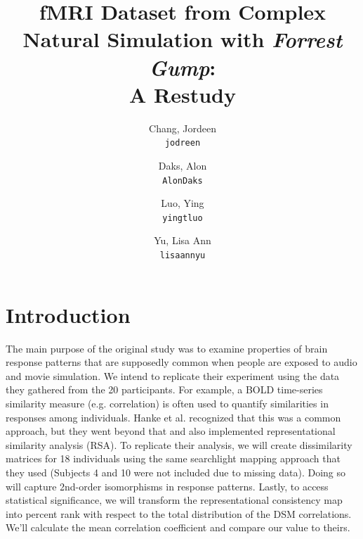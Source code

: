 \documentclass[11pt]{article}
\title{fMRI Dataset from Complex Natural Simulation with \emph{Forrest Gump}: \\A Restudy}
\author{
  Chang, Jordeen\\
  \texttt{jodreen}
  \and
  Daks, Alon\\
  \texttt{AlonDaks}
  \and
  Luo, Ying\\
  \texttt{yingtluo}
  \and
  Yu, Lisa Ann\\
  \texttt{lisaannyu}
}
\begin{document}
\maketitle


\section{Introduction}

The main purpose of the original study was to examine properties of brain
response patterns that are supposedly common when people are exposed to audio
and movie simulation. We intend to replicate their experiment using the data
they gathered from the 20 participants. For example, a BOLD time-series
similarity measure (e.g. correlation) is often used to quantify similarities
in responses among individuals. Hanke et al. recognized that this was a common
approach, but they went beyond that and also implemented representational
similarity analysis  (RSA). To replicate their analysis, we will create 
dissimilarity matrices for 18 individuals using the same searchlight mapping 
approach that they used (Subjects 4 and 10 were not included due to missing 
data). Doing so will capture 2nd-order isomorphisms in response patterns. 
Lastly, to access statistical significance, we will transform the 
representational consistency map into percent rank with respect to the total 
distribution of the DSM correlations. We'll calculate the mean correlation 
coefficient and compare our value to theirs.
\end{document}
